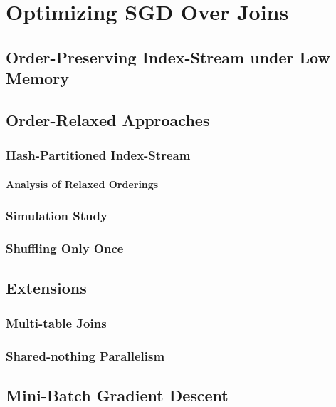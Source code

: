 \documentclass{vldb}
\begin{document}
\section{Optimizing SGD Over Joins}


\subsection{Order-Preserving Index-Stream under Low Memory}



\subsection{Order-Relaxed Approaches}

\subsubsection{Hash-Partitioned Index-Stream}

\paragraph*{Analysis of Relaxed Orderings}

\subsubsection{Simulation Study}

\subsubsection{Shuffling Only Once}


\subsection{Extensions}

\subsubsection{Multi-table Joins}

\subsubsection{Shared-nothing Parallelism}


\subsection{Mini-Batch Gradient Descent}
\end{document}

